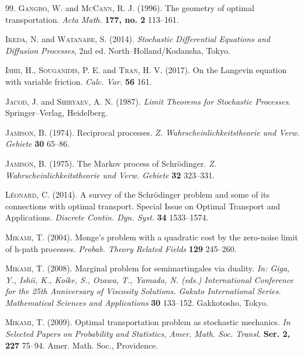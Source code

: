 \documentclass[12pt]{article}
\begin{document}
\begin{thebibliography}{99.}
\textsc{Gangbo, W.} and \textsc{McCann, R. J.} (1996).
The geometry of optimal transportation. 
\textit{Acta Math.} \textbf{177, no. 2} 113--161.

\textsc{Ikeda, N.} and \textsc{Watanabe, S.} (2014).
\textit{Stochastic Differential Equations and Diffusion Processes}, 2nd ed.
North--Holland/Kodansha, Tokyo.

\textsc{Ishii, H.}, \textsc{Souganidis, P. E.} and \textsc{Tran, H. V.} (2017).
 On the Langevin equation with variable friction. 
\textit{Calc. Var.} \textbf{56} 161.

\textsc{Jacod, J.} and \textsc{Shiryaev, A. N.} (1987).
\textit{Limit Theorems for Stochastic Processes}.
Springer--Verlag, Heidelberg.

\textsc{Jamison, B.} (1974).
Reciprocal processes. 
\textit{Z. Wahrscheinlichkeitstheorie und Verw. Gebiete} \textbf{30} 65--86.

\textsc{Jamison, B.} (1975).
The Markov process of Schr\"odinger.
\textit{Z. Wahrscheinlichkeitstheorie und Verw. Gebiete} \textbf{32} 323--331.

\textsc{L\'eonard, C.}  (2014).
A survey of the Schr\"odinger problem and some of its connections with optimal transport.
Special Issue on Optimal Transport and Applications. 
\textit{Discrete Contin. Dyn. Syst.} \textbf{34} 1533--1574.


\textsc{Mikami, T.} (2004).
Monge's problem with a quadratic cost by the zero-noise limit of h-path  processes.
\textit{Probab. Theory Related Fields} \textbf{129} 245--260.

\textsc{Mikami, T.}  (2008).
Marginal problem for semimartingales via duality.
\textit{In: Giga, Y., Ishii, K., Koike, S., Ozawa, T., Yamada, N. (eds.)
International Conference for the 25th Anniversary of Viscosity Solutions.
Gakuto International Series. Mathematical Sciences and Applications}
\textbf{30} 133--152.
Gakkotosho, Tokyo.

\textsc{Mikami, T.}  (2009).
Optimal transportation problem as stochastic mechanics.
\textit{In Selected Papers on Probability and Statistics, Amer. Math. Soc. Transl.} \textbf{Ser. 2, 227} 75--94.
 Amer. Math. Soc., Providence.
 

\end{thebibliography}
\end{document}
